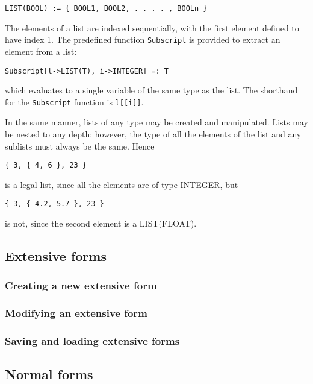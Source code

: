 \begin{verbatim}
LIST(BOOL) := { BOOL1, BOOL2, . . . . , BOOLn }
\end{verbatim}

The elements of a list are indexed sequentially, with the first element
defined to have index 1.  The predefined function \verb+Subscript+ is
provided to extract an element from a list:

\begin{verbatim}
Subscript[l->LIST(T), i->INTEGER] =: T
\end{verbatim}

\noindent which evaluates to a single variable of the same type as the list.
The shorthand for the \verb+Subscript+ function is \verb+l[[i]]+.

In the same manner, lists of any type may be created and manipulated.
Lists may be nested to any depth; however, the type of all the elements
of the list and any sublists must always be the same.  Hence

\begin{verbatim}
{ 3, { 4, 6 }, 23 }
\end{verbatim}

is a legal list, since all the elements are of type INTEGER, but

\begin{verbatim}
{ 3, { 4.2, 5.7 }, 23 }
\end{verbatim}

is not, since the second element is a LIST(FLOAT).

\subsection{Extensive forms}

\subsubsection{Creating a new extensive form}

\subsubsection{Modifying an extensive form}

\subsubsection{Saving and loading extensive forms}

\subsection{Normal forms}

